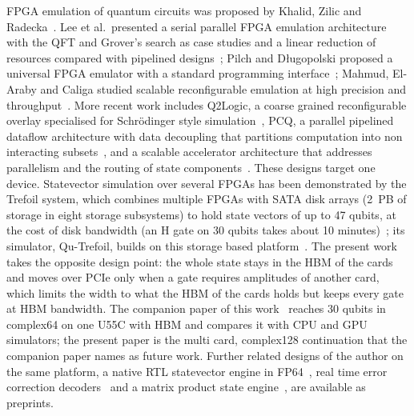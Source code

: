 FPGA emulation of quantum circuits was proposed by Khalid, Zilic and Radecka~\cite{khalid2004fpga}. Lee et al.\
presented a serial parallel FPGA emulation architecture with the QFT and Grover's search as case studies and a linear
reduction of resources compared with pipelined designs~\cite{lee2016fpga}; Pilch and D\l{}ugopolski proposed a
universal FPGA emulator with a standard programming interface~\cite{pilch2019fpga}; Mahmud, El-Araby and Caliga
studied scalable reconfigurable emulation at high precision and throughput~\cite{mahmud2019scaling}. More recent work
includes Q2Logic, a coarse grained reconfigurable overlay specialised for Schr\"odinger style
simulation~\cite{podobas2023q2logic}, PCQ, a parallel pipelined dataflow architecture with data decoupling that
partitions computation into non interacting subsets~\cite{pcq2024}, and a scalable accelerator architecture that
addresses parallelism and the routing of state components~\cite{belfore2024scalable}. These designs target one
device. Statevector simulation over several FPGAs has been demonstrated by the Trefoil system, which combines
multiple FPGAs with SATA disk arrays (2~PB of storage in eight storage subsystems) to hold state vectors of up to 47
qubits, at the cost of disk bandwidth (an H gate on 30 qubits takes about 10 minutes)~\cite{niwase2023trefoil}; its
simulator, Qu-Trefoil, builds on this storage based platform~\cite{wei2025qutrefoil}. The present work takes the
opposite design point: the whole state stays in the HBM of the cards and moves over PCIe only when a gate requires
amplitudes of another card, which limits the width to what the HBM of the cards holds but keeps every gate at HBM
bandwidth. The companion paper of this work~\cite{tiwari2026fpga30} reaches 30 qubits in complex64 on one U55C with HBM and
compares it with CPU and GPU simulators; the present paper is the multi card, complex128 continuation that the
companion paper names as future work. Further related designs of the author on the same platform, a native RTL
statevector engine in FP64~\cite{ali2026rtl}, real time error correction decoders~\cite{ali2026qec} and a matrix
product state engine~\cite{ali2026mps}, are available as preprints.
